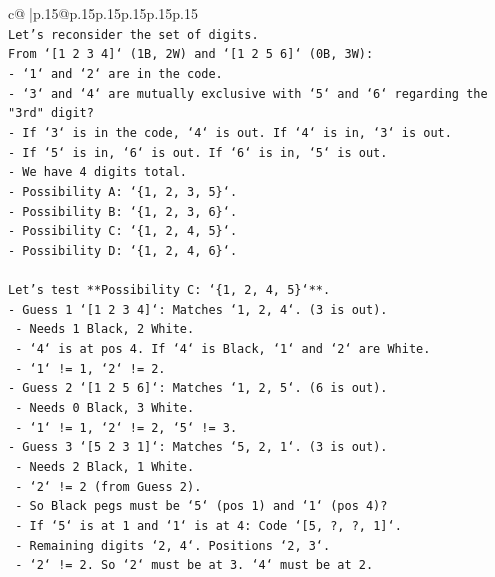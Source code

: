 \documentclass{article}
\begin{document}
{\begin{supertabular}{c@{$\;$}|p{.15\linewidth}@{}p{.15\linewidth}p{.15\linewidth}p{.15\linewidth}p{.15\linewidth}p{.15\linewidth}}
{{{\\ 
\texttt{Let's reconsider the set of digits.} \\
\texttt{From `{[}1 2 3 4{]}` (1B, 2W) and `{[}1 2 5 6{]}` (0B, 3W):} \\
\texttt{{-} `1` and `2` are in the code.} \\
\texttt{{-} `3` and `4` are mutually exclusive with `5` and `6` regarding the "3rd" digit?} \\
\texttt{{-} If `3` is in the code, `4` is out. If `4` is in, `3` is out.} \\
\texttt{{-} If `5` is in, `6` is out. If `6` is in, `5` is out.} \\
\texttt{{-} We have 4 digits total.} \\
\texttt{{-} Possibility A: `\{1, 2, 3, 5\}`.} \\
\texttt{{-} Possibility B: `\{1, 2, 3, 6\}`.} \\
\texttt{{-} Possibility C: `\{1, 2, 4, 5\}`.} \\
\texttt{{-} Possibility D: `\{1, 2, 4, 6\}`.} \\
\\ 
\texttt{Let's test **Possibility C: `\{1, 2, 4, 5\}`**.} \\
\texttt{{-} Guess 1 `{[}1 2 3 4{]}`: Matches `1, 2, 4`. (3 is out).} \\
\texttt{  {-} Needs 1 Black, 2 White.} \\
\texttt{  {-} `4` is at pos 4. If `4` is Black, `1` and `2` are White.} \\
\texttt{  {-} `1` != 1, `2` != 2.} \\
\texttt{{-} Guess 2 `{[}1 2 5 6{]}`: Matches `1, 2, 5`. (6 is out).} \\
\texttt{  {-} Needs 0 Black, 3 White.} \\
\texttt{  {-} `1` != 1, `2` != 2, `5` != 3.} \\
\texttt{{-} Guess 3 `{[}5 2 3 1{]}`: Matches `5, 2, 1`. (3 is out).} \\
\texttt{  {-} Needs 2 Black, 1 White.} \\
\texttt{  {-} `2` != 2 (from Guess 2).} \\
\texttt{  {-} So Black pegs must be `5` (pos 1) and `1` (pos 4)?} \\
\texttt{  {-} If `5` is at 1 and `1` is at 4: Code `{[}5, ?, ?, 1{]}`.} \\
\texttt{  {-} Remaining digits `2, 4`. Positions `2, 3`.} \\
\texttt{  {-} `2` != 2. So `2` must be at 3. `4` must be at 2.} \\
}}}
\end{supertabular}}
\end{document}
